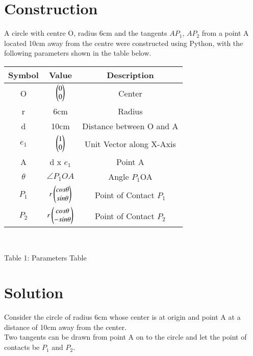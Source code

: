 \documentclass[journal,12pt,twocolumn]{IEEEtran}
\begin{document}
\section{Construction}
\vspace{0.25cm}
\raggedright
A circle with centre O, radius 6cm and the tangents $AP_1$, $AP_2$ from a point A located 10cm away from the centre were constructed using Python, with the following parameters shown in the table below.\\
\begin{tabular}{|c|c|c|}
\hline
\textbf{Symbol} & \textbf{Value} & \textbf{Description}\\
\hline
O & $\begin{pmatrix}0\\0\end{pmatrix}$ & Center \\
\hline
r & 6cm & Radius \\
\hline
d & 10cm & Distance between O and A\\
\hline
$e_1$ & $\begin{pmatrix}1\\0\end{pmatrix}$ & Unit Vector along X-Axis\\
\hline
A & d x $e_1$ & Point A \\
\hline
$\theta$ & $\angle P_1OA$ & Angle $P_1$OA\\
\hline
$P_1$ & $r \begin{pmatrix}cos\theta\\sin\theta\end{pmatrix}$ & Point of Contact $P_1$\\
\hline
$P_2$ & $r \begin{pmatrix}cos\theta\\-sin\theta\end{pmatrix}$ & Point of Contact $P_2$\\
\hline
\end{tabular}\\
\vspace{0.2cm}
\centerline{Table 1: Parameters Table}
\section{Solution}

Consider the circle of radius 6cm whose center is at origin and point A at a distance of 10cm away from the center.\\

Two tangents can be drawn from point A on to the circle and let the point of contacts be $P_1$ and $P_2$.\\

\vspace{0.25cm}
\end{document}
